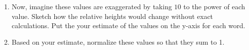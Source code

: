 \documentclass[a4paper, 14pt]{extarticle}
\begin{document}
\begin{enumerate}[resume]
    \item Now, imagine these values are exaggerated by taking $10$ to the power of each value. Sketch how the relative heights would change without exact calculations. Put the your estimate of the values on the y-axis for each word.
    \begin{center}
    \end{center}
    \item Based on your estimate, normalize these values so that they sum to 1.
\end{enumerate}
\end{document}
